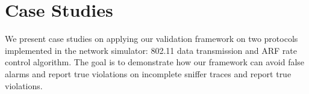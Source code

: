 \section{Case Studies}
\label{sec:case}

We present case studies on applying our validation framework on two
protocols implemented in the \ns{} network simulator: 802.11 data transmission
and ARF rate control algorithm. The goal is to demonstrate how our framework can
avoid false alarms and report true violations on incomplete sniffer traces and
report true violations.



